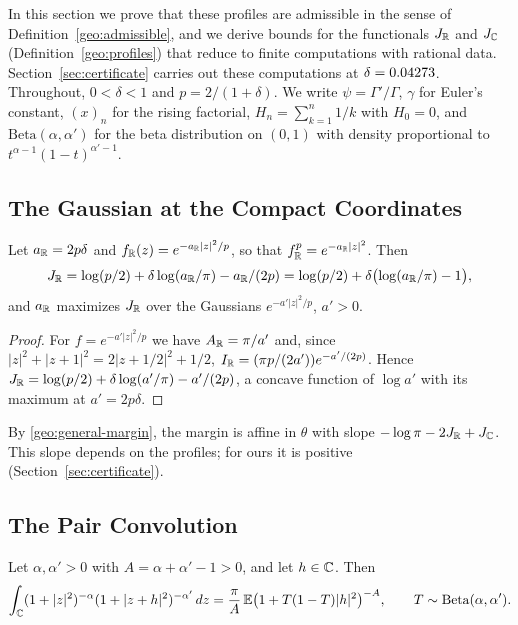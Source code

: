 In this section we prove that these profiles are admissible in the sense
of Definition~\ref{geo:admissible}, and we derive bounds for the
functionals $J_\mathbb R$ and $J_\mathbb C$ (Definition~\ref{geo:profiles}) that
reduce to finite computations with rational data. Section~\ref{sec:certificate} carries out these
computations at $\delta=0.04273$. Throughout, $0<\delta<1$ and
$p=2/(1+\delta)$. We write $\psi=\Gamma'/\Gamma$, $\gamma$ for Euler's
constant, $(x)_n$ for the rising factorial, $H_n=\sum_{k=1}^n1/k$ with
$H_0=0$, and $\mathrm{Beta}(\alpha,\alpha')$ for the beta distribution
on $(0,1)$ with density proportional to $t^{\alpha-1}(1-t)^{\alpha'-1}$.

\subsection{The Gaussian at the Compact Coordinates}

\begin{lemma}\label{pf:gaussian}
Let $a_\mathbb R=2p\delta$ and $f_\mathbb R(z)=e^{-a_\mathbb R|z|^2/p}$, so that
$f_\mathbb R^p=e^{-a_\mathbb R|z|^2}$. Then
\begin{equation}\label{pf:gaussian-compact}
 J_\mathbb R=\log(p/2)+\delta\log(a_\mathbb R/\pi)-a_\mathbb R/(2p)
 =\log(p/2)+\delta\bigl(\log(a_\mathbb R/\pi)-1\bigr),
\end{equation}
and $a_\mathbb R$ maximizes $J_\mathbb R$ over the Gaussians $e^{-a'|z|^2/p}$, $a'>0$.
\end{lemma}

\begin{proof}
For $f=e^{-a'|z|^2/p}$ we have $A_\mathbb R=\pi/a'$ and, since
$|z|^2+|z+1|^2=2|z+1/2|^2+1/2$, $I_\mathbb R=(\pi p/(2a'))e^{-a'/(2p)}$. Hence
$J_\mathbb R=\log(p/2)+\delta\log(a'/\pi)-a'/(2p)$, a concave function of
$\log a'$ with its maximum at $a'=2p\delta$.
\end{proof}

By \eqref{geo:general-margin}, the margin is affine in $\theta$ with
slope $-\log\pi-2J_\mathbb R+J_\mathbb C$. This slope depends on the profiles; for
ours it is positive (Section~\ref{sec:certificate}).

\subsection{The Pair Convolution}

\begin{lemma}\label{pf:laplace}
Let $\alpha,\alpha'>0$ with $A=\alpha+\alpha'-1>0$, and let $h\in\mathbb C$.
Then
\begin{equation}\label{pf:laplace-convolution}
 \int_{\mathbb C}(1+|z|^2)^{-\alpha}(1+|z+h|^2)^{-\alpha'}\,dz
 =\frac\pi A\,\mathbb E\bigl(1+T(1-T)|h|^2\bigr)^{-A},
 \qquad T\sim\mathrm{Beta}(\alpha,\alpha').
\end{equation}
\end{lemma}

